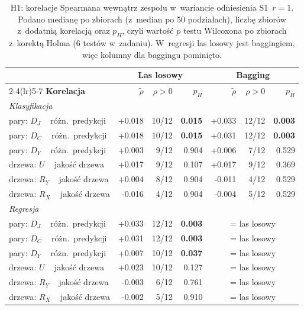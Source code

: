 \begin{table}[!htbp]
\centering\small
\caption{H1: korelacje Spearmana wewnątrz zespołu w~wariancie odniesienia S1~$r=1$. Podano medianę po zbiorach (z~median po 50 podziałach), liczbę zbiorów z~dodatnią korelacją oraz $p_H$, czyli wartość $p$ testu Wilcoxona po zbiorach z~korektą Holma (6 testów w~zadaniu). W~regresji las losowy jest baggingiem, więc kolumny dla baggingu pominięto.}
\label{tab:h1}
\begin{tabular}{lrrrrrr}
\toprule
& \multicolumn{3}{c}{\textbf{Las losowy}} & \multicolumn{3}{c}{\textbf{Bagging}} \\
\cmidrule(lr){2-4}\cmidrule(lr){5-7}
\textbf{Korelacja} & $\tilde\rho$ & $\rho>0$ & $p_H$ & $\tilde\rho$ & $\rho>0$ & $p_H$ \\
\midrule
\multicolumn{7}{l}{\emph{Klasyfikacja}}\\
pary: $D_J$ ~ różn.\ predykcji & +0.018 & 10/12 & \textbf{0.015} & +0.033 & 12/12 & \textbf{0.003} \\
pary: $D_C$ ~ różn.\ predykcji & +0.018 & 10/12 & \textbf{0.015} & +0.031 & 12/12 & \textbf{0.003} \\
pary: $D_Y$ ~ różn.\ predykcji & +0.003 & 9/12 & 0.904 & +0.006 & 7/12 & 0.529 \\
drzewa: $U$ ~ jakość drzewa & +0.017 & 9/12 & 0.107 & +0.017 & 9/12 & 0.369 \\
drzewa: $R_Y$ ~ jakość drzewa & +0.004 & 8/12 & 0.904 & -0.011 & 4/12 & 0.529 \\
drzewa: $R_X$ ~ jakość drzewa & -0.016 & 4/12 & 0.904 & -0.004 & 5/12 & 0.529 \\
\midrule
\multicolumn{7}{l}{\emph{Regresja}}\\
pary: $D_J$ ~ różn.\ predykcji & +0.033 & 12/12 & \textbf{0.003} & \multicolumn{3}{c}{= las losowy} \\
pary: $D_C$ ~ różn.\ predykcji & +0.031 & 12/12 & \textbf{0.003} & \multicolumn{3}{c}{= las losowy} \\
pary: $D_Y$ ~ różn.\ predykcji & +0.007 & 10/12 & \textbf{0.037} & \multicolumn{3}{c}{= las losowy} \\
drzewa: $U$ ~ jakość drzewa & +0.023 & 10/12 & 0.127 & \multicolumn{3}{c}{= las losowy} \\
drzewa: $R_Y$ ~ jakość drzewa & -0.003 & 6/12 & 0.761 & \multicolumn{3}{c}{= las losowy} \\
drzewa: $R_X$ ~ jakość drzewa & -0.002 & 5/12 & 0.910 & \multicolumn{3}{c}{= las losowy} \\
\bottomrule
\end{tabular}
\end{table}

